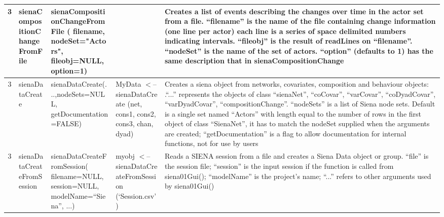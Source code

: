 \documentclass[a4paper,fleqn]{article}
\newcommand{\+}{\, + \,}
\begin{document}
{\begin{landscape}
\begin{longtable}{c | p{3cm} | p{5.2cm} | p{4.2cm} | p{8.5cm} }
3 & sienaCompositionChangeFromFile & \newline
sienaCompositionChangeFromFile ( filename, \newline
nodeSet="Actors", \newline
fileobj=NULL, option=1) & & Creates a list of events
describing the changes over time in the actor set from a file. ``filename'' is
the name of the file containing change information (one line per actor) each
line is a series of space delimited numbers indicating intervals. ``fileobj''
is the result of readLines on ``filename''. ``nodeSet'' is the name of the set
of actors. ``option'' (defaults to 1) has the same
description that in  sienaCompositionChange\\
\hline

3 & sienaDataCreate & sienaDataCreate(...,\newline nodeSets=NULL, \newline
getDocumentation=FALSE) &
MyData $<$-- \newline
sienaDataCreate (net, cons1, cons2, cons3, \newline
chan, dyad) & Creates a siena object from networks, covariates,
composition and behaviour objects: .``...''  represents the objects of class
``sienaNet'', ``coCovar'', ``varCovar'', ``coDyadCovar'', ``varDyadCovar'',
``compositionChange''. ``nodeSets'' is a list of Siena node sets. Default is a
single set named ``Actors'' with length equal to the number of rows in the
first object of class ``SienaNet'', it has to match the nodeSet supplied when
the arguments are created; ``getDocumentation'' is a flag to allow
documentation for internal functions,  not for use by users\\
\hline

3 & sienaDataCreateFromSession & \newline
sienaDataCreateFromSession( \newline
filename=NULL, \newline
session=NULL, \newline
modelName=``Siena'', ...) & myobj $<$-- \newline
sienaDataCreateFromSession  \newline
(`Session.csv') & Reads a SIENA session from a file and creates a
Siena Data object or group. ``file'' is the session file; ``session'' is the
input session if the function is called from siena01Gui(); ``modelName'' is the
project's name; ``...'' refers to other
arguments used by siena01Gui()\\
\hline


\end{longtable}
\end{landscape}}
\end{document}
